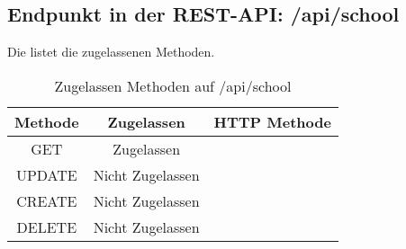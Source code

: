 \subsection{Endpunkt in der REST-API: /api/school}
Die  listet die zugelassenen Methoden. 

\begin{table}[!htbp]
	\begin{tabular}{|c|c|c|}
		\hline
			\textbf{Methode} & \textbf{Zugelassen} & \textbf{HTTP Methode} \\ \hline
			GET & Zugelassen &  \\ \hline
			UPDATE & Nicht Zugelassen & \\ \hline 
			CREATE & Nicht Zugelassen & \\ \hline 
			DELETE & Nicht Zugelassen & \\ \hline
	\end{tabular}

		\caption{Zugelassen Methoden auf /api/school}
		\label{tab:end:rest:api:school:meth}
\end{table}